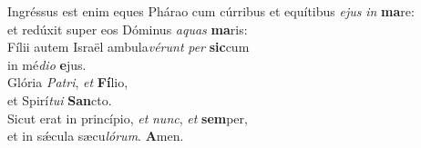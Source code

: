 \oddverse Ingréssus est enim eques Phárao cum cúrribus et equítibus \textit{e}\textit{jus} \textit{in} \textbf{ma}re:~\*\\
\oddverse et redúxit super eos Dóminus \textit{a}\textit{quas} \textbf{ma}ris:\\
\evenverse Fílii autem Israël ambula\textit{vé}\textit{runt} \textit{per} \textbf{sic}cum~\*\\
\evenverse in mé\textit{di}\textit{o} \textbf{e}jus.\\
\oddverse Glória \textit{Pa}\textit{tri}, \textit{et} \textbf{Fí}lio,~\*\\
\oddverse et Spirí\textit{tu}\textit{i} \textbf{San}cto.\\
\evenverse Sicut erat in princípio, \textit{et} \textit{nunc}, \textit{et} \textbf{sem}per,~\*\\
\evenverse et in sǽcula sæcu\textit{ló}\textit{rum}. \textbf{A}men.\\
